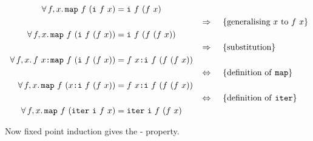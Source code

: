 \begin{align*}
\w \faa{f}{x} \hs{map} \w f \w (\hs{i} \w f \w x) & \eq \hs{i} \w f \w (f \w x) \\
\descra{generalising $x$ to $f \w x$} \\
\w \faa{f}{x} \hs{map} \w f \w (\hs{i} \w f \w (f \w x)) & \eq \hs{i} \w f \w (f \w (f \w x)) \\
\descra{substitution} \\
\w \faa{f}{x} f \w x \hs{:} \hs{map} \w f \w (\hs{i} \w f \w (f \w x)) & \eq f \w x \hs{:} \hs{i} \w f \w (f \w (f \w x)) \\
\desclra{\defof{\texttt{map}}} \\
\w \faa{f}{x} \hs{map} \w f \w (x \hs{:} \hs{i} \w f \w (f \w x)) & \eq f \w x \hs{:} \hs{i} \w f \w (f \w (f \w x)) \\
\desclra{\defof{\texttt{iter}}} \\
\w \faa{f}{x} \hs{map} \w f \w (\hs{iter} \w \hs{i} \w f \w x) & \eq \hs{iter} \w \hs{i} \w f \w (f \w x) \\
\end{align*}

Now fixed point induction gives the - property.



